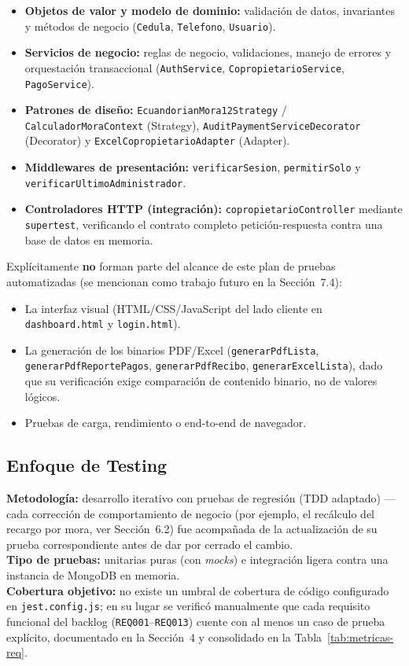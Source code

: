 \documentclass[12pt,a4paper]{article}
\begin{document}
\begin{itemize}[nosep]
    \item \textbf{Objetos de valor y modelo de dominio:} validación de datos, invariantes y
    métodos de negocio (\texttt{Cedula}, \texttt{Telefono}, \texttt{Usuario}).
    \item \textbf{Servicios de negocio:} reglas de negocio, validaciones, manejo de errores
    y orquestación transaccional (\texttt{AuthService}, \texttt{CopropietarioService},
    \texttt{PagoService}).
    \item \textbf{Patrones de diseño:} \texttt{EcuandorianMora12Strategy} /
    \texttt{CalculadorMoraContext} (Strategy), \texttt{AuditPaymentServiceDecorator}
    (Decorator) y \texttt{ExcelCopropietarioAdapter} (Adapter).
    \item \textbf{Middlewares de presentación:} \texttt{verificarSesion},
    \texttt{permitirSolo} y \texttt{verificarUltimoAdministrador}.
    \item \textbf{Controladores HTTP (integración):} \texttt{copropietarioController} mediante
    \texttt{supertest}, verificando el contrato completo petición-respuesta contra una base
    de datos en memoria.
\end{itemize}

Explícitamente \textbf{no} forman parte del alcance de este plan de pruebas automatizadas
(se mencionan como trabajo futuro en la Sección~7.4):

\begin{itemize}[nosep]
    \item La interfaz visual (HTML/CSS/JavaScript del lado cliente en
    \texttt{dashboard.html} y \texttt{login.html}).
    \item La generación de los binarios PDF/Excel (\texttt{generarPdfLista},
    \texttt{generarPdfReportePagos}, \texttt{generarPdfRecibo}, \texttt{generarExcelLista}),
    dado que su verificación exige comparación de contenido binario, no de valores lógicos.
    \item Pruebas de carga, rendimiento o end-to-end de navegador.
\end{itemize}

\subsection{Enfoque de Testing}

\textbf{Metodología:} desarrollo iterativo con pruebas de regresión (TDD adaptado) —
cada corrección de comportamiento de negocio (por ejemplo, el recálculo del recargo por
mora, ver Sección~6.2) fue acompañada de la actualización de su prueba correspondiente
antes de dar por cerrado el cambio.\\
\textbf{Tipo de pruebas:} unitarias puras (con \emph{mocks}) e integración ligera contra
una instancia de MongoDB en memoria.\\
\textbf{Cobertura objetivo:} no existe un umbral de cobertura de código configurado en
\texttt{jest.config.js}; en su lugar se verificó manualmente que cada requisito funcional
del backlog (\texttt{REQ001}–\texttt{REQ013}) cuente con al menos un caso de prueba
explícito, documentado en la Sección~4 y consolidado en la Tabla~\ref{tab:metricas-req}.
\end{document}
